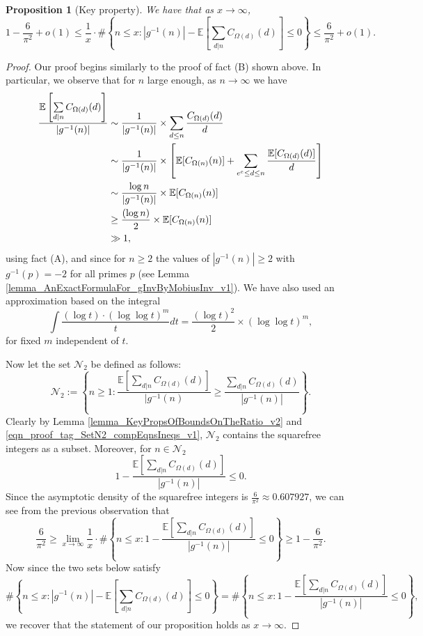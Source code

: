 \documentclass[11pt,reqno,a4letter]{article}
\numberwithin{figure}{section}
\numberwithin{table}{section}
\theoremstyle{plain}
\newtheorem{prop}[theorem]{Proposition}
\numberwithin{theorem}{section}
\theoremstyle{definition}
\begin{document}
\begin{prop}[Key property] 
\label{prop_CondAvgOrderGInvxSummatoryFunc_KeyProp_v2} 
We have that as $x \rightarrow \infty$, 
\[
1-\frac{6}{\pi^2} + o(1) \leq \frac{1}{x} \cdot \#\left\{n \leq x: |g^{-1}(n)| - \mathbb{E}\left[ 
     \sum_{d|n} C_{\Omega(d)}(d)\right] \leq 0\right\} \leq \frac{6}{\pi^2} + o(1). 
\]
\end{prop} 
\begin{proof} 
Our proof begins similarly to the proof of fact (B) shown above. 
In particular, we observe that for $n$ large enough, as $n \rightarrow \infty$ we have 
\begin{align} 
\notag 
\frac{\mathbb{E}\left[\sum\limits_{d|n} C_{\Omega(d)}(d)\right]}{|g^{-1}(n)|} & \sim 
     \frac{1}{|g^{-1}(n)|} \times \sum_{d \leq n} \frac{C_{\Omega(d)}(d)}{d} \\ 
\notag 
     & \sim \frac{1}{|g^{-1}(n)|} \times \left[ 
     \mathbb{E}[C_{\Omega(n)}(n)] + \sum_{e^e \leq d \leq n} \frac{\mathbb{E}[C_{\Omega(d)}(d)]}{d}
     \right] \\ 
\notag 
     & \sim \frac{\log n}{|g^{-1}(n)|} \times \mathbb{E}[C_{\Omega(n)}(n)] \\ 
\notag 
     & \geq \frac{(\log n)}{2} \times \mathbb{E}[C_{\Omega(n)}(n)] \\ 
\label{eqn_proof_tag_SetN2_compEqnsIneqs_v1} 
     & \gg 1, 
\end{align} 
using fact (A), and since for $n \geq 2$ the values of $|g^{-1}(n)| \geq 2$ 
with $g^{-1}(p) = -2$ for all primes $p$ (see Lemma \ref{lemma_AnExactFormulaFor_gInvByMobiusInv_v1}). 
We have also used an approximation based on the integral 
\[
\int \frac{(\log t) \cdot (\log\log t)^m}{t} dt = \frac{(\log t)^2}{2} \times (\log\log t)^m, 
\]
for fixed $m$ independent of $t$. 

Now let the set $\mathcal{N}_2$ be defined as follows: 
\[
\mathcal{N}_2 := \left\{n \geq 1: \frac{\mathbb{E}\left[\sum\limits_{d|n} C_{\Omega(d)}(d)\right]}{|g^{-1}(n)} \geq 
     \frac{\sum\limits_{d|n} C_{\Omega(d)}(d)}{|g^{-1}(n)|}\right\}. 
\]
Clearly by Lemma \ref{lemma_KeyPropsOfBoundsOnTheRatio_v2} and 
\eqref{eqn_proof_tag_SetN2_compEqnsIneqs_v1}, $\mathcal{N}_2$ contains the 
squarefree integers as a subset. Moreover, for $n \in \mathcal{N}_2$ 
\[
1 - \frac{\mathbb{E}\left[\sum\limits_{d|n} C_{\Omega(d)}(d)\right]}{|g^{-1}(n)|} \leq 0. 
\]
Since the asymptotic density of the squarefree integers is $\frac{6}{\pi^2} \approx 0.607927$, we can see 
from the previous observation that 
\[
\frac{6}{\pi^2} \geq \lim_{x \rightarrow \infty} \frac{1}{x} \cdot \#\left\{n \leq x: 
     1 - \frac{\mathbb{E}\left[\sum\limits_{d|n} C_{\Omega(d)}(d)\right]}{|g^{-1}(n)|} \leq 0\right\} \geq 
     1 - \frac{6}{\pi^2}. 
\]
Now since the two sets below satisfy  
\[
\#\left\{n \leq x: |g^{-1}(n)| - \mathbb{E}\left[ 
     \sum_{d|n} C_{\Omega(d)}(d)\right] \leq 0\right\} = 
     \#\left\{n \leq x: 
     1 - \frac{\mathbb{E}\left[\sum\limits_{d|n} C_{\Omega(d)}(d)\right]}{|g^{-1}(n)|} \leq 0\right\}, 
\]
we recover that the statement of our proposition holds as $x \rightarrow \infty$. 
\end{proof} 
\end{document}
